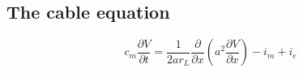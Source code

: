 \documentclass[a4paper, 12pt]{article}
\begin{document}
\subsection{The cable equation}
\[c_m\frac{\partial V}{\partial t} = \frac{1}{2ar_L}\frac{\partial}{\partial x}(a^2\frac{\partial V}{\partial x})-i_m+i_e\]
\begin{figure}[H]
	\centering
\end{figure}
\end{document}
